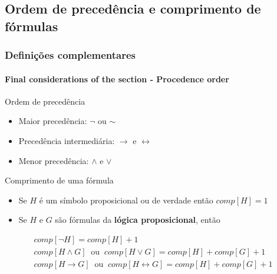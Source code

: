 \documentclass[10pt, headsepline, captions=tableabove,xcolor=table]{beamer}
\begin{document}
\subsection{Ordem de precedência e comprimento de fórmulas}
%
\begin{frame}[t]
    \frametitle{Definições complementares}
    \framesubtitle{Final considerations of the section - Procedence order}
    \small
    \begin{block}{Ordem de precedência}
        \begin{itemize}
            \item Maior precedência: $\lnot$ ou $\sim$ 
            \item Precedência intermediária: $\rightarrow$ e $\leftrightarrow$
            \item Menor precedência: $\land$ e $\lor$
        \end{itemize}        
    \end{block}
    \pause
    \begin{block}{Comprimento de uma fórmula}
        \begin{itemize}
            \item Se $H$ é um símbolo proposicional ou de verdade então $comp[H]=1$
            \item Se $H$ e $G$ são fórmulas da \textbf{lógica proposicional}, então
        \end{itemize}
        \begin{gather*}
            comp[\lnot H] = comp[H] + 1 \\
            comp[H \land G]~\text{ ou }~comp[H \lor G] = comp[H] + comp[G] + 1 \\
            comp[H \rightarrow G]~\text{ ou }~comp[H \leftrightarrow G] = comp[H] + comp[G] + 1
        \end{gather*}
    \end{block}
\end{frame}
%
\end{document}
